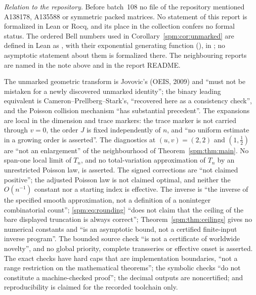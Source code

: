 \begin{writenote}
\emph{Relation to the repository.} Before batch~108 no file of the
repository mentioned A138178, A135588 or symmetric packed matrices. No
statement of this report is formalized in Lean or Rocq, and its place in
the collection confers no formal status. The ordered Bell numbers used in
Corollary~\ref{spm:cor:unmarked} are defined in Lean as
, with their exponential generating function
(), in
; no
asymptotic statement about them is formalized there. The neighbouring
reports are named in the note above and in the report README.
\end{writenote}
\begin{writenote}
The unmarked geometric transform is Jovovic's (OEIS, 2009) and ``must not
be mistaken for a newly discovered unmarked identity''; the binary leading
equivalent is Cameron--Prellberg--Stark's, ``recovered here as a
consistency check'', and the Poisson collision mechanism ``has substantial
precedent''. The expansions are local in the dimension and trace markers:
the trace marker is not carried through $v=0$, the order $J$ is fixed
independently of $n$, and ``no uniform estimate in a growing order is
asserted''. The diagnostics at $(u,v)=(2,2)$ and $(1,\tfrac12)$ are ``not
an enlargement'' of the neighbourhood of Theorem~\ref{spm:thm:main}. No
span-one local limit of $T_n$, and no total-variation approximation of
$T_n$ by an unrestricted Poisson law, is asserted. The signed corrections
are ``not claimed positive''; the adjusted Poisson law is not claimed
optimal, and neither the $O(n^{-1})$ constant nor a starting index is
effective. The inverse is ``the inverse of the specified smooth
approximation, not a definition of a noninteger combinatorial count'';
\eqref{spm:eq:rounding} ``does not claim that the ceiling of the bare
displayed truncation is always correct''; Theorem~\ref{spm:thm:ceilings}
gives no numerical constants and ``is an asymptotic bound, not a certified
finite-input inverse program''. The bounded source check ``is not a
certificate of worldwide novelty'', and no global priority, complete
transseries or effective onset is asserted. The exact checks have hard caps
that are implementation boundaries, ``not a range restriction on the
mathematical theorems''; the symbolic checks ``do not constitute a
machine-checked proof''; the decimal outputs are noncertified; and
reproducibility is claimed for the recorded toolchain only.
\end{writenote}
